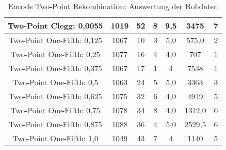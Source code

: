 \begin{table}[H]
\begin{tabular}{c | c | c | c | c | c | c}
		\hline
		Two-Point Clegg: 0,0055 & 1019 & 52 & 8 & 9,5 & 3475 & 7\\
		\hline
		Two-Point One-Fifth: 0,125 & 1067 & 10 & 3 & 5,0 & 575,0 & 2\\
		\hline
		Two-Point One-Fifth: 0,25 & 1077 & 16 & 4 & 4,0 & 707 & 1\\
		\hline
		Two-Point One-Fifth: 0,375 & 1067 & 17 & 1 & 4 & 7538 & 1\\
		\hline
		Two-Point One-Fifth: 0,5 & 1063 & 24 & 5 & 5,0 & 3363 & 3\\
		\hline
		Two-Point One-Fifth: 0,625 & 1075 & 32 & 6 & 4,0 & 4919 & 5\\
		\hline
		Two-Point One-Fifth: 0,75 & 1078 & 34 & 8 & 4,0 & 1312,0 & 6\\
		\hline
		Two-Point One-Fifth: 0,875 & 1088 & 36 & 4 & 5,0 & 2529,5 & 6\\
		\hline
		Two-Point One-Fifth: 1,0 & 1049 & 43 & 7 & 4 & 1140 & 5\\
	\end{tabular}
	\caption{Encode Two-Point Rekombination: Auswertung der Rohdaten}
	\label{table:encodeTwoPointRohdaten}
\end{table}

